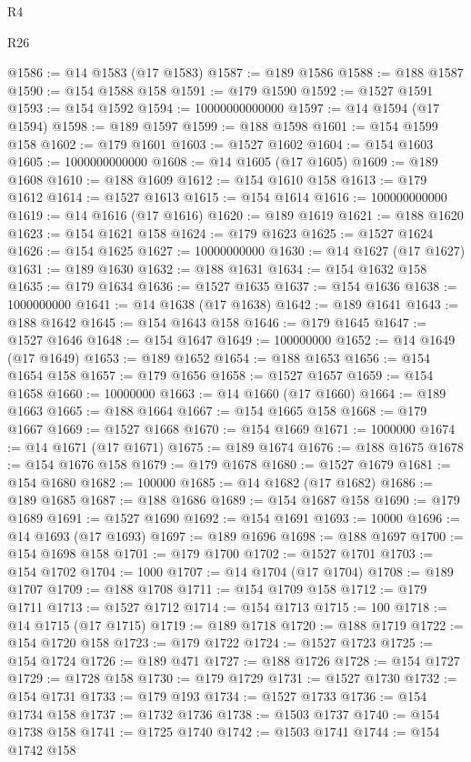\begin{lexlean}{R4}
\begin{lexlean}{R26}
\begin{coremodule}
{{{{{{{{{{{{{{{{{{{{{{{{{{{{{{{{{{{{{{{{{{{{{{{{{{{{{{{{{{{{{{{{{{{{{{{{@1586 := @14 @1583 (@17 @1583)
@1587 := @189 @1586
@1588 := @188 @1587
@1590 := @154 @1588 @158
@1591 := @179 @1590
@1592 := @1527 @1591
@1593 := @154 @1592
@1594 := 10000000000000
@1597 := @14 @1594 (@17 @1594)
@1598 := @189 @1597
@1599 := @188 @1598
@1601 := @154 @1599 @158
@1602 := @179 @1601
@1603 := @1527 @1602
@1604 := @154 @1603
@1605 := 1000000000000
@1608 := @14 @1605 (@17 @1605)
@1609 := @189 @1608
@1610 := @188 @1609
@1612 := @154 @1610 @158
@1613 := @179 @1612
@1614 := @1527 @1613
@1615 := @154 @1614
@1616 := 100000000000
@1619 := @14 @1616 (@17 @1616)
@1620 := @189 @1619
@1621 := @188 @1620
@1623 := @154 @1621 @158
@1624 := @179 @1623
@1625 := @1527 @1624
@1626 := @154 @1625
@1627 := 10000000000
@1630 := @14 @1627 (@17 @1627)
@1631 := @189 @1630
@1632 := @188 @1631
@1634 := @154 @1632 @158
@1635 := @179 @1634
@1636 := @1527 @1635
@1637 := @154 @1636
@1638 := 1000000000
@1641 := @14 @1638 (@17 @1638)
@1642 := @189 @1641
@1643 := @188 @1642
@1645 := @154 @1643 @158
@1646 := @179 @1645
@1647 := @1527 @1646
@1648 := @154 @1647
@1649 := 100000000
@1652 := @14 @1649 (@17 @1649)
@1653 := @189 @1652
@1654 := @188 @1653
@1656 := @154 @1654 @158
@1657 := @179 @1656
@1658 := @1527 @1657
@1659 := @154 @1658
@1660 := 10000000
@1663 := @14 @1660 (@17 @1660)
@1664 := @189 @1663
@1665 := @188 @1664
@1667 := @154 @1665 @158
@1668 := @179 @1667
@1669 := @1527 @1668
@1670 := @154 @1669
@1671 := 1000000
@1674 := @14 @1671 (@17 @1671)
@1675 := @189 @1674
@1676 := @188 @1675
@1678 := @154 @1676 @158
@1679 := @179 @1678
@1680 := @1527 @1679
@1681 := @154 @1680
@1682 := 100000
@1685 := @14 @1682 (@17 @1682)
@1686 := @189 @1685
@1687 := @188 @1686
@1689 := @154 @1687 @158
@1690 := @179 @1689
@1691 := @1527 @1690
@1692 := @154 @1691
@1693 := 10000
@1696 := @14 @1693 (@17 @1693)
@1697 := @189 @1696
@1698 := @188 @1697
@1700 := @154 @1698 @158
@1701 := @179 @1700
@1702 := @1527 @1701
@1703 := @154 @1702
@1704 := 1000
@1707 := @14 @1704 (@17 @1704)
@1708 := @189 @1707
@1709 := @188 @1708
@1711 := @154 @1709 @158
@1712 := @179 @1711
@1713 := @1527 @1712
@1714 := @154 @1713
@1715 := 100
@1718 := @14 @1715 (@17 @1715)
@1719 := @189 @1718
@1720 := @188 @1719
@1722 := @154 @1720 @158
@1723 := @179 @1722
@1724 := @1527 @1723
@1725 := @154 @1724
@1726 := @189 @471
@1727 := @188 @1726
@1728 := @154 @1727
@1729 := @1728 @158
@1730 := @179 @1729
@1731 := @1527 @1730
@1732 := @154 @1731
@1733 := @179 @193
@1734 := @1527 @1733
@1736 := @154 @1734 @158
@1737 := @1732 @1736
@1738 := @1503 @1737
@1740 := @154 @1738 @158
@1741 := @1725 @1740
@1742 := @1503 @1741
@1744 := @154 @1742 @158
}}}}}}}}}}}}}}}}}}}}}}}}}}}}}}}}}}}}}}}}}}}}}}}}}}}}}}}}}}}}}}}}}}}}}}}}
\end{coremodule}
\end{lexlean}
\end{lexlean}
